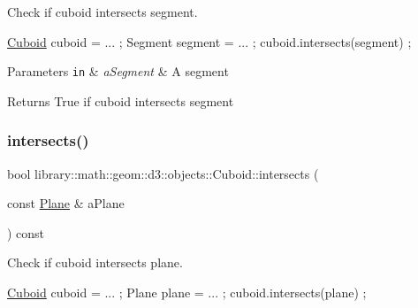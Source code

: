 Check if cuboid intersects segment. 


\begin{DoxyCode}
\hyperlink{classlibrary_1_1math_1_1geom_1_1d3_1_1objects_1_1_cuboid_ac42299f962fab284a76a46d4ea4e6fa2}{Cuboid} cuboid = ... ;
Segment segment = ... ;
cuboid.intersects(segment) ;
\end{DoxyCode}



\begin{DoxyParams}[1]{Parameters}
\mbox{\tt in}  & {\em a\+Segment} & A segment \\
\hline
\end{DoxyParams}
\begin{DoxyReturn}{Returns}
True if cuboid intersects segment 
\end{DoxyReturn}
\mbox{\label{classlibrary_1_1math_1_1geom_1_1d3_1_1objects_1_1_cuboid_ac064fe1f0ef33fd5bdab5aede2e671af}} 
\subsubsection{\texorpdfstring{intersects()}{intersects()}\hspace{0.1cm}{\footnotesize\ttfamily [6/9]}}
{\footnotesize\ttfamily bool library\+::math\+::geom\+::d3\+::objects\+::\+Cuboid\+::intersects (\begin{DoxyParamCaption}\item[{const \hyperlink{classlibrary_1_1math_1_1geom_1_1d3_1_1objects_1_1_plane}{Plane} \&}]{a\+Plane }\end{DoxyParamCaption}) const}



Check if cuboid intersects plane. 


\begin{DoxyCode}
\hyperlink{classlibrary_1_1math_1_1geom_1_1d3_1_1objects_1_1_cuboid_ac42299f962fab284a76a46d4ea4e6fa2}{Cuboid} cuboid = ... ;
Plane plane = ... ;
cuboid.intersects(plane) ;
\end{DoxyCode}



